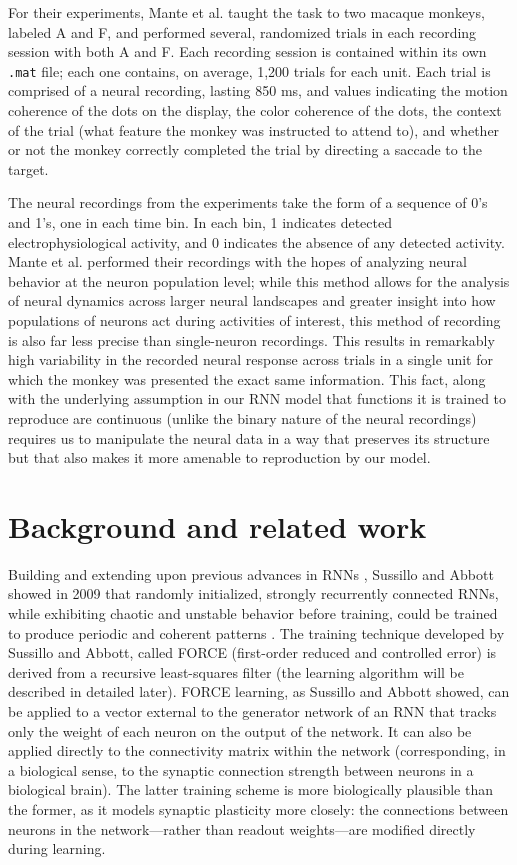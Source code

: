 \documentclass[12pt,a4paper,final]{iopart}
\begin{document}
For their experiments, Mante et al. taught the task to two macaque monkeys, labeled A and F, and performed several, randomized trials in each recording session with both A and F. Each recording session is contained within its own \texttt{.mat} file; each one contains, on average, 1,200 trials for each unit. Each trial is comprised of a neural recording, lasting 850 ms, and values indicating the motion coherence of the dots on the display, the color coherence of the dots, the context of the trial (what feature the monkey was instructed to attend to), and whether or not the monkey correctly completed the trial by directing a saccade to the target.

The neural recordings from the experiments take the form of a sequence of 0's and 1's, one in each time bin. In each bin, 1 indicates detected electrophysiological activity, and 0 indicates the absence of any detected activity. Mante et al. performed their recordings with the hopes of analyzing neural behavior at the neuron population level; while this method allows for the analysis of neural dynamics across larger neural landscapes and greater insight into how populations of neurons act during activities of interest, this method of recording is also far less precise than single-neuron recordings. This results in remarkably high variability in the recorded neural response across trials in a single unit for which the monkey was presented the exact same information. This fact, along with the underlying assumption in our RNN model that functions it is trained to reproduce are continuous (unlike the binary nature of the neural recordings) requires us to manipulate the neural data in a way that preserves its structure but that also makes it more amenable to reproduction by our model. 

\section{Background and related work}
\label{sec:back}
Building and extending upon previous advances in RNNs \cite{Jaeger}, Sussillo and Abbott showed in 2009 that randomly initialized, strongly recurrently connected RNNs, while exhibiting chaotic and unstable behavior before training, could be trained to produce periodic and coherent patterns \cite{Sussillo}. The training technique developed by Sussillo and Abbott, called FORCE (first-order reduced and controlled error) is derived from a recursive least-squares filter (the learning algorithm will be described in detailed later). FORCE learning, as Sussillo and Abbott showed, can be applied to a vector external to the generator network of an RNN that tracks only the weight of each neuron on the output of the network. It can also be applied directly to the connectivity matrix within the network (corresponding, in a biological sense, to the synaptic connection strength between neurons in a biological brain). The latter training scheme is more biologically plausible than the former, as it models synaptic plasticity more closely: the connections between neurons in the network—rather than readout weights—are modified directly during learning.
\end{document}
